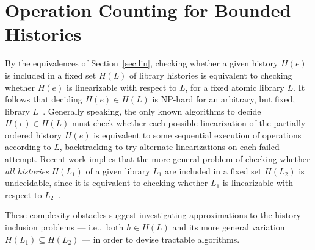 \section{Operation Counting for Bounded Histories}
\label{sec:counting}

By the equivalences of Section~\ref{sec:lin}, checking whether a given history
$H(e)$ is included in a fixed set $H(L)$ of library histories is equivalent to
checking whether $H(e)$ is linearizable with respect to $L$, for a fixed atomic
library $L$. It follows that deciding $H(e) \in H(L)$ is NP-hard for an
arbitrary, but fixed, library $L$~\cite{journals/siamcomp/GibbonsK97}.
Generally speaking, the only known algorithms to decide $H(e) \in H(L)$ must
check whether each possible linearization of the partially-ordered history
$H(e)$ is equivalent to some sequential execution of operations according to
$L$, backtracking to try alternate linearizations on each failed attempt.
Recent work implies that the more general problem of checking whether \emph{all
histories} $H(L_1)$ of a given library $L_1$ are included in a fixed set
$H(L_2)$ is undecidable, since it is equivalent to checking whether $L_1$ is
linearizable with respect to $L_2$~\cite{conf/esop/BouajjaniEEH13}.

These complexity obstacles suggest investigating approximations to the history
inclusion problems --- i.e.,~both $h \in H(L)$ and its more general variation
$H(L_1) \subseteq H(L_2)$ --- in order to devise tractable algorithms.

